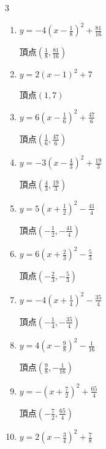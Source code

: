 \begin{multicols}{3}
\begin{enumerate}
        $\displaystyle 頂点\left( -\frac{3}{2} , -\frac{25}{4} \right)$

  \item $\displaystyle y=-4\left( x-\frac{1}{8}\right)^{2}+\frac{81}{16}$

        $\displaystyle 頂点\left( \frac{1}{8} , \frac{81}{16} \right)$

  \item $\displaystyle y=2\left( x-1\right)^{2}+7$

        $\displaystyle 頂点\left( 1 , 7 \right)$

  \item $\displaystyle y=6\left( x-\frac{1}{6}\right)^{2}+\frac{47}{6}$

        $\displaystyle 頂点\left( \frac{1}{6} , \frac{47}{6} \right)$

  \item $\displaystyle y=-3\left( x-\frac{4}{3}\right)^{2}+\frac{19}{3}$

        $\displaystyle 頂点\left( \frac{4}{3} , \frac{19}{3} \right)$

  \item $\displaystyle y=5\left( x+\frac{1}{2}\right)^{2}-\frac{41}{4}$

        $\displaystyle 頂点\left( -\frac{1}{2} , -\frac{41}{4} \right)$

  \item $\displaystyle y=6\left( x+\frac{2}{3}\right)^{2}-\frac{5}{3}$

        $\displaystyle 頂点\left( -\frac{2}{3} , -\frac{5}{3} \right)$

  \item $\displaystyle y=-4\left( x+\frac{1}{4}\right)^{2}-\frac{35}{4}$

        $\displaystyle 頂点\left( -\frac{1}{4} , -\frac{35}{4} \right)$

  \item $\displaystyle y=4\left( x-\frac{9}{8}\right)^{2}-\frac{1}{16}$

        $\displaystyle 頂点\left( \frac{9}{8} , -\frac{1}{16} \right)$

\columnbreak %

  \item $\displaystyle y=-\left( x+\frac{7}{2}\right)^{2}+\frac{65}{4}$

        $\displaystyle 頂点\left( -\frac{7}{2} , \frac{65}{4} \right)$

  \item $\displaystyle y=2\left( x-\frac{3}{4}\right)^{2}+\frac{7}{8}$


\end{enumerate}
\end{multicols}
